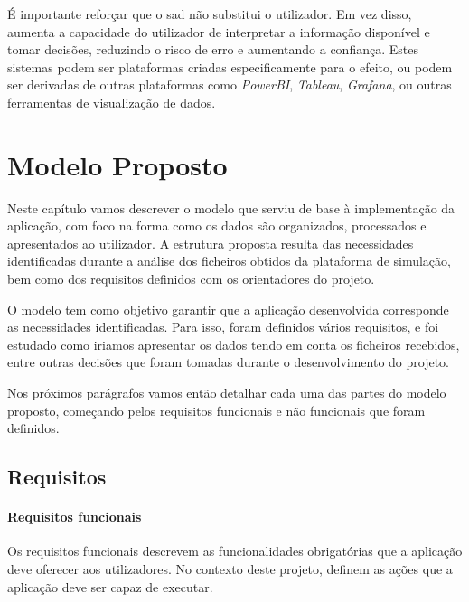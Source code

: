 É importante reforçar que o \gls{sad} não substitui o utilizador. Em vez disso, aumenta a capacidade do utilizador de interpretar a informação disponível e tomar decisões, reduzindo o risco de erro e aumentando a confiança. Estes sistemas podem ser plataformas criadas especificamente para o efeito, ou podem ser derivadas de outras plataformas como \textit{PowerBI}, \textit{Tableau}, \textit{Grafana}, ou outras ferramentas de visualização de dados.

\chapter{Modelo Proposto}
\label{ch:modeloProposto}

Neste capítulo vamos descrever o modelo que serviu de base à implementação da aplicação, com foco na forma como os dados são organizados, processados e apresentados ao utilizador. A estrutura proposta resulta das necessidades identificadas durante a análise dos ficheiros obtidos da plataforma de simulação, bem como dos requisitos definidos com os orientadores do projeto.

O modelo tem como objetivo garantir que a aplicação desenvolvida corresponde as necessidades identificadas. Para isso, foram definidos vários requisitos, e foi estudado como iriamos apresentar os dados tendo em conta os ficheiros recebidos, entre outras decisões que foram tomadas durante o desenvolvimento do projeto.

Nos próximos parágrafos vamos então detalhar cada uma das partes do modelo proposto, começando pelos requisitos funcionais e não funcionais que foram definidos.

\section{Requisitos}
\label{sec:requisitos}

\subsubsection{Requisitos funcionais}

Os requisitos funcionais descrevem as funcionalidades obrigatórias que a aplicação deve oferecer aos utilizadores. No contexto deste projeto, definem as ações que a aplicação deve ser capaz de executar.

